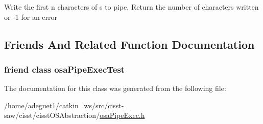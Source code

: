 Write the first n characters of s to pipe. Return the number of characters written or -\/1 for an error 

\subsection{Friends And Related Function Documentation}
\hypertarget{classosa_pipe_exec_aed1009b8c9ee63f8ec90db36f10ef0b7}{
\subsubsection[{osa\-Pipe\-Exec\-Test}]{\setlength{\rightskip}{0pt plus 5cm}friend class osa\-Pipe\-Exec\-Test\hspace{0.3cm}{\ttfamily [friend]}}}\label{classosa_pipe_exec_aed1009b8c9ee63f8ec90db36f10ef0b7}


The documentation for this class was generated from the following file\-:\begin{DoxyCompactItemize}
\item 
/home/adeguet1/catkin\-\_\-ws/src/cisst-\/saw/cisst/cisst\-O\-S\-Abstraction/\hyperlink{osa_pipe_exec_8h}{osa\-Pipe\-Exec.\-h}\end{DoxyCompactItemize}
